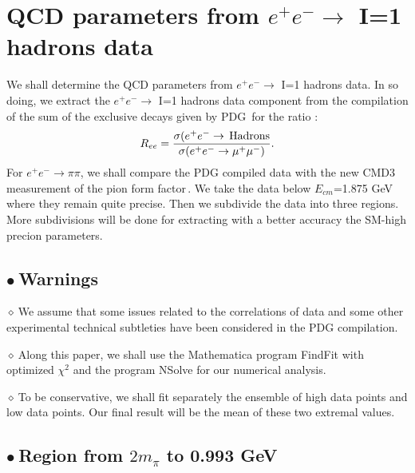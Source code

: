 \documentclass[review]{elsarticle}
\def\beq{\begin{equation}}
\def\eeq{\end{equation}}
\def\b{$\bullet~$}
\def\d{$\diamond~$}
\begin{document}
\section{QCD parameters from $e^+e^-\to$ I=1 hadrons data }
We shall determine the QCD  parameters from $e^+e^-\to$ I=1 hadrons data. In so doing, 
we extract the $e^+e^-\to$ I=1 hadrons data component  from   the compilation of the sum of the exclusive decays given by PDG\,\cite{PDG} for the ratio :
\beq
R_{ee}=\frac{\sigma(e^+e^-\to\,{\rm Hadrons}}{\sigma(e^+e^-\to\mu^+\mu^-)}.
\label{eq:Ree}
\eeq
For $e^+e^-\to \pi\pi$, we shall compare the PDG compiled data with the new CMD3 measurement of the pion form factor\,\cite{CMD3}. We take the data below $E_{cm}$=1.875 GeV where they remain quite precise. Then we subdivide the data into three regions. More subdivisions will be done for extracting with a better accuracy the SM-high precion parameters.
\subsection*{\b Warnings}
\d We assume that some issues related to the correlations of data and some other experimental technical subtleties  have been considered in the PDG compilation. 

\d Along this paper, we shall use the Mathematica program FindFit with optimized $\chi^2$ and the program NSolve for our numerical analysis. 

\d To be conservative, we shall fit separately the ensemble of high data points and low data points. Our final result will be the mean of these two extremal values. 
\subsection*{\b Region from $2m_\pi$ to   0.993 GeV}
\end{document}
